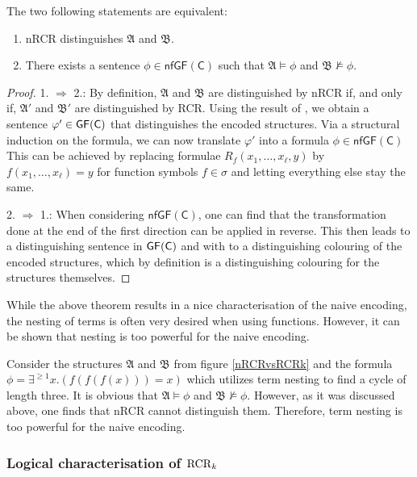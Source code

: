 \begin{theorem}
	\label{thm:ThmA}
	The two following statements are equivalent:
	\begin{enumerate}
		\item nRCR distinguishes $\mathfrak A$ and $\mathfrak B$.
		\item There exists a sentence $\phi\in \mathsf{nfGF}(\mathsf C)$ such that $\mathfrak A\models \phi$ and $\mathfrak B\not\models \phi$.
	\end{enumerate}
\end{theorem}
\begin{proof}
	1. $\Rightarrow$ 2.:
	By definition, $\mathfrak A$ and $\mathfrak B$ are distinguished by nRCR if, and only if, $\mathfrak A'$ and $\mathfrak B'$ are distinguished by RCR.
	Using the result of \cite{scheidt2025ColorRefinement}, we obtain a sentence $\varphi'\in\mathsf{GF}(\mathsf{C})$ that distinguishes the encoded structures.
	Via a structural induction on the formula, we can now translate $\varphi'$ into a formula $\phi\in \mathsf{nfGF}(\mathsf C)$
	This can be achieved by replacing formulae $R_f(x_1,\dots,x_\ell,y)$ by $f(x_1,\dots,x_\ell)=y$ for function symbols $f\in\sigma$ and letting everything else stay the same.
	
	2. $\Rightarrow$ 1.:
	When considering $\mathsf{nfGF}(\mathsf C)$, one can find that the transformation done at the end of the first direction can be applied in reverse.
	This then leads to a distinguishing sentence in $\mathsf{GF}(\mathsf{C})$ and with \cite{scheidt2025ColorRefinement} to a distinguishing colouring of the encoded structures, which by definition is a distinguishing colouring for the structures themselves.
\end{proof}

While the above theorem results in a nice characterisation of the naive encoding, the nesting of terms is often very desired when using functions.
However, it can be shown that nesting is too powerful for the naive encoding.

Consider the structures $\mathfrak A$ and $\mathfrak B$ from figure \ref{nRCRvsRCRk} and the formula $\phi=\exists^{\geq 1} x.(f(f(f(x)))=x)$ which utilizes term nesting to find a cycle of length three.
It is obvious that $\mathfrak A \models \phi$ and $\mathfrak B\not\models \phi$.
However, as it was discussed above, one finds that nRCR cannot distinguish them.
Therefore, term nesting is too powerful for the naive encoding.


\subsubsection{Logical characterisation of $\operatorname{RCR}_k$}

